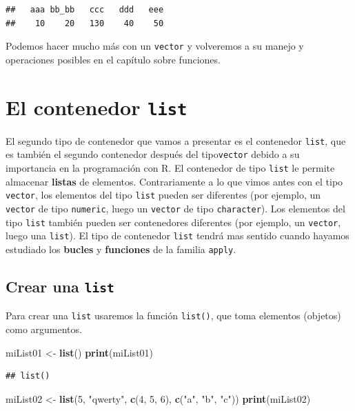 \documentclass[]{book}
\newenvironment{Shaded}{\begin{snugshade}}{\end{snugshade}}
\newcommand{\KeywordTok}[1]{\textcolor[rgb]{0.13,0.29,0.53}{\textbf{#1}}}
\newcommand{\DecValTok}[1]{\textcolor[rgb]{0.00,0.00,0.81}{#1}}
\newcommand{\StringTok}[1]{\textcolor[rgb]{0.31,0.60,0.02}{#1}}
\newcommand{\NormalTok}[1]{#1}
\begin{document}
\begin{verbatim}
##   aaa bb_bb   ccc   ddd   eee 
##    10    20   130    40    50
\end{verbatim}

Podemos hacer mucho más con un \texttt{vector} y volveremos a su manejo
y operaciones posibles en el capítulo sobre funciones.

\section{\texorpdfstring{El contenedor
\texttt{list}}{El contenedor list}}\label{el-contenedor-list}

El segundo tipo de contenedor que vamos a presentar es el contenedor
\texttt{list}, que es también el segundo contenedor después del
tipo\texttt{vector} debido a su importancia en la programación con R. El
contenedor de tipo \texttt{list} le permite almacenar \textbf{listas} de
elementos. Contrariamente a lo que vimos antes con el tipo
\texttt{vector}, los elementos del tipo \texttt{list} pueden ser
diferentes (por ejemplo, un \texttt{vector} de tipo \texttt{numeric},
luego un \texttt{vector} de tipo \texttt{character}). Los elementos del
tipo \texttt{list} también pueden ser contenedores diferentes (por
ejemplo, un \texttt{vector}, luego una \texttt{list}). El tipo de
contenedor \texttt{list} tendrá mas sentido cuando hayamos estudiado los
\textbf{bucles} y \textbf{funciones} de la familia \texttt{apply}.

\subsection{\texorpdfstring{Crear una
\texttt{list}}{Crear una list}}\label{crear-una-list}

Para crear una \texttt{list} usaremos la función \texttt{list()}, que
toma elementos (objetos) como argumentos.

\begin{Shaded}
\begin{Highlighting}[]
\NormalTok{miList01 <-}\StringTok{ }\KeywordTok{list}\NormalTok{()}
\KeywordTok{print}\NormalTok{(miList01)}
\end{Highlighting}
\end{Shaded}

\begin{verbatim}
## list()
\end{verbatim}

\begin{Shaded}
\begin{Highlighting}[]
\NormalTok{miList02 <-}\StringTok{ }\KeywordTok{list}\NormalTok{(}\DecValTok{5}\NormalTok{, }\StringTok{"qwerty"}\NormalTok{, }\KeywordTok{c}\NormalTok{(}\DecValTok{4}\NormalTok{, }\DecValTok{5}\NormalTok{, }\DecValTok{6}\NormalTok{), }\KeywordTok{c}\NormalTok{(}\StringTok{"a"}\NormalTok{, }\StringTok{"b"}\NormalTok{, }\StringTok{"c"}\NormalTok{))}
\KeywordTok{print}\NormalTok{(miList02)}
\end{Highlighting}
\end{Shaded}
\end{document}
